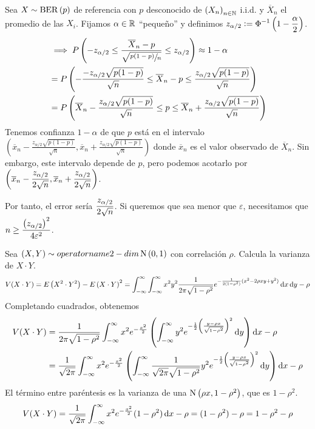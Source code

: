 \begin{ejem}
	Sea $X\sim \operatorname{BER}\left(p\right)$ de referencia con $p$ desconocido de $\left(X_n\right)_{n\in\mathbb{N}}$ i.i.d. y $\overline{X}_n$ el promedio de las $X_i$. Fijamos $\alpha \in \mathbb{R}$ ``pequeño'' y definimos $\displaystyle z_{\alpha/2} \vcentcolon= \Phi^{-1}\left(1-\frac{\alpha}{2}\right)$.
	\[\begin{aligned}
			 & \implies P\left(-z_{\alpha/2} \leq \frac{\overline{X}_n - p}{\sqrt{\sfrac{p(1-p)}{n}}} \leq z_{\alpha/2}\right) \approx 1-\alpha                    \\
			 & = P\left(-\frac{-z_{\alpha/2}\sqrt{p(1-p)}}{\sqrt{n}} \leq \overline{X}_n - p \leq \frac{z_{\alpha/2}\sqrt{p(1-p)}}{\sqrt{n}}\right)                \\
			 & = P\left(\overline{X}_n - \frac{z_{\alpha/2}\sqrt{p(1-p)}}{\sqrt{n}} \leq p \leq \overline{X}_n + \frac{z_{\alpha/2}\sqrt{p(1-p)}}{\sqrt{n}}\right)
		\end{aligned}\]
	Tenemos confianza $1-\alpha$ de que $p$ está en el intervalo $\left(\overline{x}_n - \frac{z_{\alpha/2}\sqrt{p(1-p)}}{\sqrt{n}}, \overline{x}_n + \frac{z_{\alpha/2}\sqrt{p(1-p)}}{\sqrt{n}}\right)$ donde $\overline{x}_n$ es el valor observado de $\overline{X}_n$. Sin embargo, este intervalo depende de $p$, pero podemos acotarlo por $\displaystyle \left(\overline{x}_n - \frac{z_{\alpha/2}}{2\sqrt{n}}, \overline{x}_n + \frac{z_{\alpha/2}}{2\sqrt{n}}\right)$.

	Por tanto, el error sería $\displaystyle \frac{z_{\alpha/2}}{2\sqrt{n}}$. Si queremos que sea menor que $\varepsilon$, necesitamos que $\displaystyle n \geq \frac{\left(z_{\alpha/2}\right)^2}{4\varepsilon^2}$.
\end{ejem}


\begin{ejer}
	Sea $(X, Y) \sim \\operatorname{2-dim}\operatorname{N}\left(0,1\right)$ con correlación $\rho$. Calcula la varianza de $X\cdot Y$.
	\[V(X\cdot Y) = E\left(X^2\cdot Y^2\right) - E\left(X\cdot Y\right)^2 = \int_{-\infty}^{\infty} \int_{-\infty}^{\infty} x^2y^2\frac{1}{2\pi\sqrt{1-\rho^2}}e^{-\frac{1}{2(1-\rho^2)}(x^2-2\rho xy + y^2)}\odif{x} \odif{y} - \rho\]
	Completando cuadrados, obtenemos
	\[\begin{aligned} %
			V(X\cdot Y) & = \frac{1}{2\pi\sqrt{1-\rho^2}}\int_{-\infty}^{\infty} x^2 e^{-\frac{x^2}{2}} \left(\int_{-\infty}^{\infty} y^2 e^{-\frac{1}{2}\left(\frac{y-\rho x}{\sqrt{1-\rho^2}}\right)^2}\odif{y}\right)\odif{x} -                     \rho           \\
			            & = \frac{1}{\sqrt{2\pi}} \int_{-\infty}^{\infty} x^2 e^{-\frac{x^2}{2}} \left(\int_{-\infty}^{\infty} \frac{1}{\sqrt{2\pi}\sqrt{1-\rho^2}}y^2 e^{-\frac{1}{2}\left(\frac{y-\rho x}{\sqrt{1-\rho^2}}\right)^2}\odif{y}\right) \odif{x} - \rho
		\end{aligned}\]
	El término entre paréntesis es la varianza de una $\operatorname{N}\left(\rho x, 1-\rho^2\right)$, que es $1-\rho^2$.
	\[V(X\cdot Y) = \frac{1}{\sqrt{2\pi}} \int_{-\infty}^{\infty} x^2 e^{-\frac{x^2}{2}}(1-\rho^2)\odif{x} - \rho = (1-\rho^2) - \rho = 1-\rho^2-\rho\]
\end{ejer}

